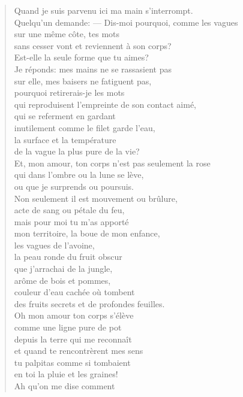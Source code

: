 \documentclass[11pt,a4paper]{book}
\begin{document}
\begin{verse}
Quand je suis parvenu ici ma main s'interrompt. \\
Quelqu'un demande: --- Dis-moi pourquoi, comme les vagues \\
sur une même côte, tes mots \\
sans cesser vont et reviennent à son corps? \\
Est-elle la seule forme que tu aimes? \\
Je réponds: mes mains ne se rassasient pas \\
sur elle, mes baisers ne fatiguent pas, \\
pourquoi retirerais-je les mots \\
qui reproduisent l'empreinte de son contact aimé, \\
qui se referment en gardant \\
inutilement comme le filet garde l'eau, \\
la surface et la température \\
de la vague la plus pure de la vie? \\
Et, mon amour, ton corps n'est pas seulement la rose \\
qui dans l'ombre ou la lune se lève, \\
ou que je surprends ou poursuis. \\
Non seulement il est mouvement ou brûlure, \\
acte de sang ou pétale du feu, \\
mais pour moi tu m'as apporté \\
mon territoire, la boue de mon enfance, \\
les vagues de l'avoine, \\
la peau ronde du fruit obscur \\
que j'arrachai de la jungle, \\
arôme de bois et pommes, \\
couleur d'eau cachée où tombent \\
des fruits secrets et de profondes feuilles. \\
Oh mon amour ton corps s'élève \\
comme une ligne pure de pot \\
depuis la terre qui me reconnaît \\
et quand te rencontrèrent mes sens  \\
tu palpitas comme si tombaient \\
en toi la pluie et les graines! \\
Ah qu'on me dise comment \\

\end{verse}
\end{document}
